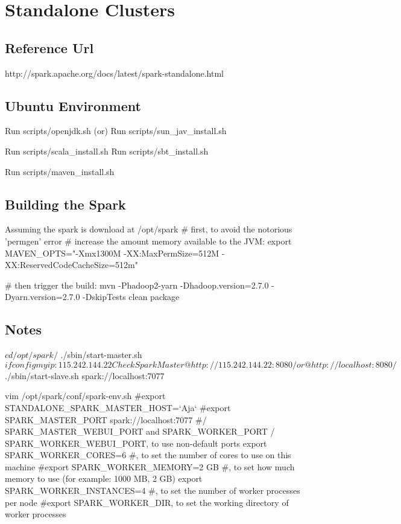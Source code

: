 \chapter{Standalone Clusters}

\section{Reference Url}
 http://spark.apache.org/docs/latest/spark-standalone.html

\section{Ubuntu Environment}

Run scripts/openjdk.sh (or)
Run scripts/sun_jav_install.sh

Run scripts/scala_install.sh
Run scripts/sbt_install.sh

Run scripts/maven_install.sh

\section{Building the Spark}
Assuming the spark is download at /opt/spark
# first, to avoid the notorious 'permgen' error
# increase the amount memory available to the JVM:
export MAVEN_OPTS="-Xmx1300M -XX:MaxPermSize=512M -XX:ReservedCodeCacheSize=512m"

# then trigger the build:
mvn -Phadoop2-yarn -Dhadoop.version=2.7.0 -Dyarn.version=2.7.0 -DskipTests clean package

\section {Notes}
$ cd /opt/spark/
$ ./sbin/start-master.sh
$ ifconfig
my ip: 115.242.144.22
Check Spark Master @ http://115.242.144.22:8080/ or @ http://localhost:8080/
$ ./sbin/start-slave.sh spark://localhost:7077


vim  /opt/spark/conf/spark-env.sh
#export STANDALONE_SPARK_MASTER_HOST=`Aja`
#export SPARK_MASTER_PORT spark://localhost:7077
#/ SPARK_MASTER_WEBUI_PORT and SPARK_WORKER_PORT / SPARK_WORKER_WEBUI_PORT, to use non-default ports
export SPARK_WORKER_CORES=6 #, to set the number of cores to use on this machine
#export SPARK_WORKER_MEMORY=2 GB #, to set how much memory to use (for example: 1000 MB, 2 GB)
export SPARK_WORKER_INSTANCES=4 #, to set the number of worker processes per node
#export SPARK_WORKER_DIR, to set the working directory of worker processes

